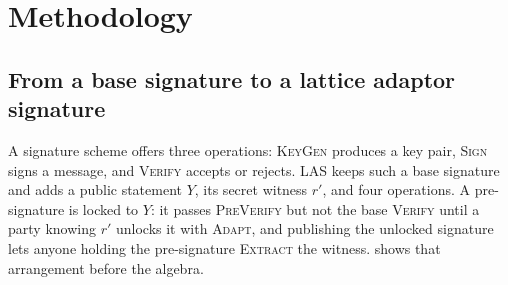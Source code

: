 \chapter{Methodology}
\label{ch:methodology}

\section{From a base signature to a lattice adaptor signature}
\label{sec:construction}

A signature scheme offers three operations: \textsc{KeyGen} produces a key pair,
\textsc{Sign} signs a message, and \textsc{Verify} accepts or rejects. LAS keeps such a
base signature and adds a public statement $Y$, its secret witness $r'$, and four
operations. A pre-signature is locked to $Y$: it passes \textsc{PreVerify} but not the
base \textsc{Verify} until a party knowing $r'$ unlocks it with \textsc{Adapt}, and
publishing the unlocked signature lets anyone holding the pre-signature
\textsc{Extract} the witness. 
shows that arrangement before the algebra.

